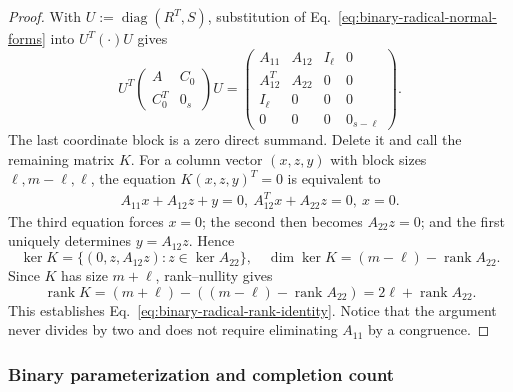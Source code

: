 \documentclass[11pt]{article}
\newcommand{\rank}{\operatorname{rank}}
\newcommand{\1}{\mathbf 1}
\theoremstyle{plain}
\theoremstyle{definition}
\theoremstyle{remark}
\begin{document}
\begin{proof}
With $U:=\operatorname{diag}(R^T,S)$, substitution of
Eq.~\eqref{eq:binary-radical-normal-forms} into $U^T(\cdot)U$ gives
\begin{equation}
 U^T\begin{pmatrix}A&C_0\\C_0^T&0_s\end{pmatrix}U
 =\begin{pmatrix}
 A_{11}&A_{12}&I_\ell&0\\
 A_{12}^T&A_{22}&0&0\\
 I_\ell&0&0&0\\
 0&0&0&0_{s-\ell}
 \end{pmatrix}.
 \label{eq:binary-radical-full-normal-form}
\end{equation}
The last coordinate block is a zero direct summand.  Delete it and call the
remaining matrix $K$.  For a column vector $(x,z,y)$ with block sizes
$\ell,m-\ell,\ell$, the equation $K(x,z,y)^T=0$ is equivalent to
\begin{align}
 A_{11}x+A_{12}z+y=0,~
 A_{12}^Tx+A_{22}z=0,~
 x=0.
 \label{eq:binary-radical-kernel-system}
\end{align}
The third equation forces $x=0$; the second then becomes $A_{22}z=0$; and the
first uniquely determines $y=A_{12}z$.  Hence
\begin{equation}
 \ker K=\{(0,z,A_{12}z):z\in\ker A_{22}\},
 \quad \dim\ker K=(m-\ell)-\rank A_{22}.
 \label{eq:binary-radical-kernel-parametrization}
\end{equation}
Since $K$ has size $m+\ell$, rank--nullity gives
\begin{equation}
 \rank K=(m+\ell)-((m-\ell)-\rank A_{22})
 =2\ell+\rank A_{22}.
 \label{eq:binary-radical-rank-from-kernel}
\end{equation}
This establishes Eq.~\eqref{eq:binary-radical-rank-identity}.  Notice that the
argument never divides by two and does not require eliminating $A_{11}$ by a
congruence.
\end{proof}

\subsubsection{Binary parameterization and completion count}
\label{subsubsec:binary-completion-parameterization}
\end{document}
